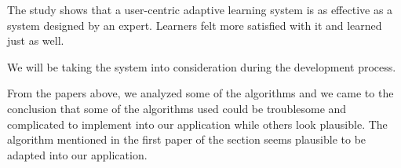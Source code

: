The study shows that a user-centric adaptive learning system is as effective as a system designed by an expert. Learners felt more satisfied with it and learned just as well.

We will be taking the system into consideration during the development process.\newline

\noindent\hspace{1.5em}
From the papers above, we analyzed some of the algorithms and we came to the conclusion that some of the algorithms used could be troublesome and complicated to implement into our application while others look plausible. The algorithm mentioned in the first paper of the section seems plausible to be adapted into our application. 